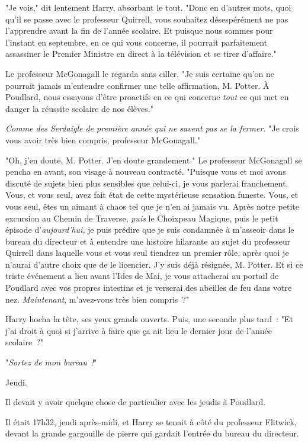 "Je vois," dit lentement Harry, absorbant le tout. "Donc en d'autres mots, quoi qu'il se passe avec le professeur Quirrell, vous souhaitez désespérément ne pas l'apprendre avant la fin de l'année scolaire. Et puisque nous sommes pour l'instant en septembre, en ce qui vous concerne, il pourrait parfaitement assassiner le Premier Ministre en direct à la télévision et se tirer d'affaire."

Le professeur McGonagall le regarda sans ciller. "Je suis certaine qu'on ne pourrait jamais m'entendre confirmer une telle affirmation, M. Potter. À Poudlard, nous essayons d'être proactifs en ce qui concerne \emph{tout} ce qui met en danger la réussite scolaire de nos élèves."

\emph{Comme des Serdaigle de première année qui ne savent pas se la fermer.} "Je crois vous avoir très bien compris, professeur McGonagall."

"Oh, j'en doute, M. Potter. J'en doute grandement." Le professeur McGonagall se pencha en avant, son visage à nouveau contracté. "Puisque vous et moi avons discuté de sujets bien plus sensibles que celui-ci, je vous parlerai franchement. Vous, et vous seul, avez fait état de cette mystérieuse sensation funeste. Vous, et vous seul, êtes un aimant à chaos tel que je n'en ai jamais vu. Après notre petite excursion au Chemin de Traverse, \emph{puis} le Choixpeau Magique, puis le petit épisode d'\emph{aujourd'hui}, je puis prédire que je suis condamnée à m'asseoir dans le bureau du directeur et à entendre une histoire hilarante au sujet du professeur Quirrell dans laquelle vous et vous seul tiendrez un premier rôle, après quoi je n'aurai d'autre choix que de le licencier. J'y suis déjà résignée, M. Potter. Et si ce triste événement a lieu avant l'Ides de Mai, je vous attacherai au portail de Poudlard avec vos propres intestins et je verserai des abeilles de feu dans votre nez. \emph{Maintenant}, m'avez-vous très bien compris~?"

Harry hocha la tête, ses yeux grands ouverts. Puis, une seconde plus tard~: "Et j'ai droit à quoi si j'arrive à faire que ça ait lieu le dernier jour de l'année scolaire~?"

"\emph{Sortez de mon bureau~!}"

\later

Jeudi.

Il devait y avoir quelque chose de particulier avec les jeudis à Poudlard.

Il était 17h32, jeudi après-midi, et Harry se tenait à côté du professeur Flitwick, devant la grande gargouille de pierre qui gardait l'entrée du bureau du directeur.

